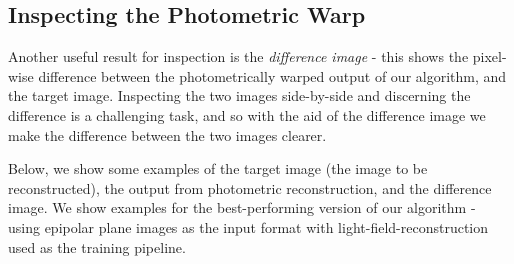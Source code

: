 \begin{figure}[H]
{    }
    \setcounter{subfigure}{0}
\end{figure}

\subsection{Inspecting the Photometric Warp}

Another useful result for inspection is the \textit{difference image} - this shows the pixel-wise difference between the photometrically warped output of our algorithm, and the target image. Inspecting the two images side-by-side and discerning the difference is a challenging task, and so with the aid of the difference image we make the difference between the two images clearer.

Below, we show some examples of the target image (the image to be reconstructed), the output from photometric reconstruction, and the difference image. We show examples for the best-performing version of our algorithm - using epipolar plane images as the input format with light-field-reconstruction used as the training pipeline. 

